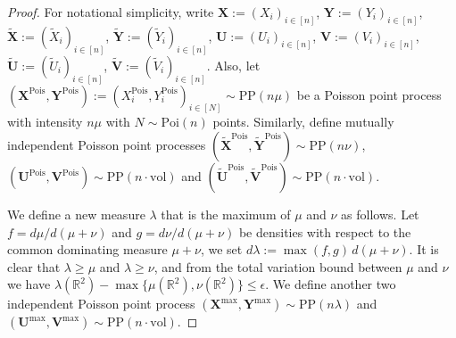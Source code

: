 \documentclass[11pt]{article}
\newcommand{\bs}[1]{\boldsymbol{#1}}
\begin{document}
\begin{proof}
For notational simplicity, write $\bs{X}:=(X_i)_{i\in[n]}$, $\bs{Y}:=(Y_i)_{i\in[n]}$, $\tilde {\bs{X}}:=(\tilde X_i)_{i\in[n]}$, $\tilde{\bs Y} :=(\tilde Y_i)_{i\in[n]}$, $\bs{U}:=(U_i)_{i\in[n]}$, $\bs{V}:=(V_i)_{i\in[n]}$, $\tilde {\bs{U}}:=(\tilde U_i)_{i\in[n]}$, $\tilde{\bs V} :=(\tilde V_i)_{i\in[n]}$. Also, let $(\bs X^{\mathrm{Pois}}, \bs Y^{\mathrm{Pois}}) := (X^{\mathrm{Pois}}_i, Y^{\mathrm{Pois}}_i)_{i\in[N]} \sim \mathrm{PP}(n\mu)$ be a Poisson point process with intensity $n\mu$ with $N\sim \mathrm{Poi}(n)$ points. Similarly, define mutually independent Poisson point processes $(\tilde{\bs X}^{\mathrm{Pois}}, \tilde{\bs Y}^{\mathrm{Pois}}) \sim \mathrm{PP}(n\nu)$, $(\bs U^{\mathrm{Pois}}, \bs V^{\mathrm{Pois}}) \sim \mathrm{PP}(n\cdot\mathrm{vol})$ and $(\tilde{\bs U}^{\mathrm{Pois}}, \tilde{\bs V}^{\mathrm{Pois}}) \sim \mathrm{PP}(n\cdot\mathrm{vol})$. 

We define a new measure $\lambda$ that is the maximum of $\mu$ and $\nu$ as follows. Let $f = d\mu / d(\mu+\nu)$ and $g = d\nu/d(\mu+\nu)$ be densities with respect to the common dominating measure $\mu+\nu$, we set $d\lambda:= \max(f,g) \, d(\mu+\nu)$. It is clear that $\lambda\geq \mu$ and $\lambda\geq \nu$, and from the total variation bound between $\mu$ and $\nu$ we have $\lambda(\mathbb{R}^2) - \max\{\mu(\mathbb{R}^2),\nu(\mathbb{R}^2)\}\leq \epsilon$. We define another two independent Poisson point process $(\bs X^{\mathrm{max}}, \bs Y^{\mathrm{max}}) \sim \mathrm{PP}(n\lambda)$ and $(\bs U^{\mathrm{max}}, \bs V^{\mathrm{max}}) \sim \mathrm{PP}(n \cdot\mathrm{vol})$.


\end{proof}
\end{document}
